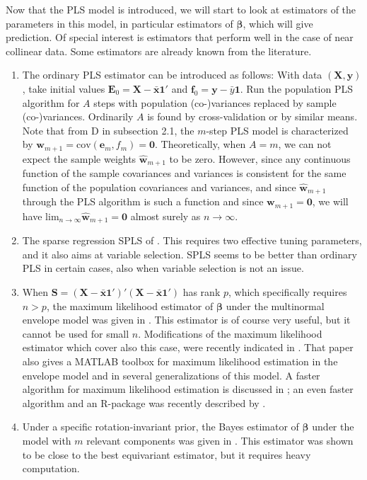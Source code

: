 \documentclass[num-refs]{wiley-article}
\begin{document}
Now that the PLS model is introduced, we will start to look at estimators of the parameters in this model, in particular estimators of $\bm{\beta}$, which will give prediction. Of special interest is estimators that perform well in the case of near collinear data. Some estimators are already known from the literature.

\begin{enumerate}[label=\alph*.]

\item The ordinary PLS estimator can be introduced as follows: With data $(\bm{X},\bm{y})$, take initial values $\bm{E}_{0}=\bm{X}-\bar{\bm{x}}\bm{1}'$
  and $\bm{f}_{0}=\bm{y}-\bar{y}\bm{1}$. Run the population PLS algorithm for $A$ steps with population (co-)variances replaced by sample (co-)variances.
  Ordinarily $A$ is found by cross-validation or by similar means. Note that from D in subsection 2.1, the $m$-step PLS model is characterized by $\bm{w}_{m+1}=\mathrm{cov}(\bm{e}_m,f_m)=\bm{0}$. Theoretically, when $A=m$, we can not expect the sample weights $\widehat{\bm{w}}_{m+1}$
  to be zero. However, since any continuous function of the sample covariances and variances is consistent for the same function of the
  population covariances and variances, and since  $\widehat{\bm{w}}_{m+1}$ through the PLS algorithm is such a function and since $\bm{w}_{m+1}=\bm{0}$, we will have ${\mathrm{lim}_{n\rightarrow\infty}}\widehat{\bm{w}}_{m+1}=\bm{0}$ almost surely as $n\rightarrow\infty$.
  \smallskip

\item The sparse regression SPLS of \citet{chun2010sparse}. This requires two effective tuning parameters, and it also aims at variable selection. SPLS seems to be better than ordinary PLS in certain cases, also when variable selection is not an issue.
  \smallskip

\item When $\bm{S}=(\bm{X}-\bar{\bm{x}}\bm{1}')'(\bm{X}-\bar{\bm{x}}\bm{1}')$ has rank $p$, which specifically requires $n>p$, the maximum likelihood
  estimator of $\bm{\beta}$ under the multinormal envelope model was given in \citet{cook2013envelopes}. This estimator is of course very useful, but it cannot be used for small $n$. Modifications of the maximum likelihood estimator which cover also this case, were recently indicated in \citet{cook2015envlp}. That paper also gives a MATLAB toolbox for maximum likelihood estimation in the envelope model and in several generalizations of this model. A faster algorithm for maximum likelihood estimation is discussed in \citet{cook2016algorithms}; an even faster algorithm and an R-package was recently described by \citet{cook2016note}.
  \smallskip

\item Under a specific rotation-invariant prior, the Bayes estimator of $\bm{\beta}$ under the model with $m$ relevant components was given in \citet{helland2012near}. This estimator was shown to be close to the best equivariant estimator, but it requires heavy computation.
  \smallskip

\end{enumerate}
\end{document}

